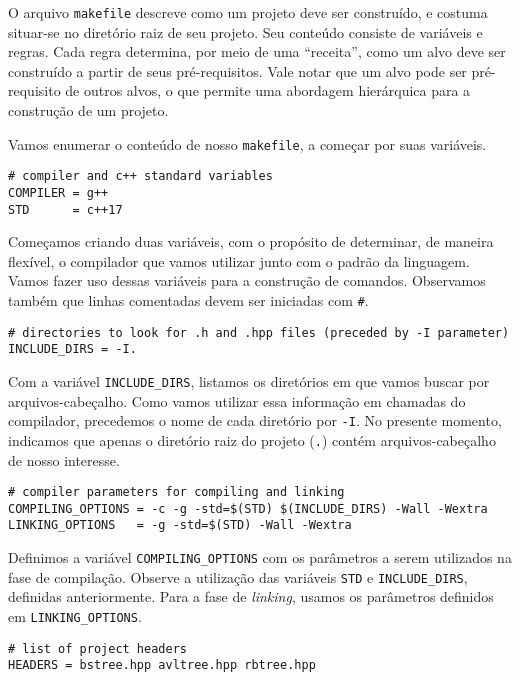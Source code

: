\documentclass[11pt]{article}
\begin{document}
O arquivo \texttt{makefile} descreve como um projeto deve ser
construído, e costuma situar-se no diretório raiz de seu projeto.
Seu conteúdo consiste de variáveis e regras.  Cada regra determina,
por meio de uma ``receita'', como um alvo deve ser construído a
partir de seus pré-requisitos.  Vale notar que um alvo pode ser
pré-requisito de outros alvos, o que permite uma abordagem
hierárquica para a construção de um projeto.

Vamos enumerar o conteúdo de nosso \texttt{makefile}, a começar por
suas variáveis.

\begin{verbatim}
# compiler and c++ standard variables
COMPILER = g++
STD      = c++17
\end{verbatim}

Começamos criando duas variáveis, com o propósito de determinar, de
maneira flexível, o compilador que vamos utilizar junto com o
padrão da linguagem.  Vamos fazer uso dessas variáveis para a
construção de comandos.  Observamos também que linhas comentadas
devem ser iniciadas com \texttt{\#}.

\begin{verbatim}
# directories to look for .h and .hpp files (preceded by -I parameter)
INCLUDE_DIRS = -I.
\end{verbatim}

Com a variável \texttt{INCLUDE\_DIRS}, listamos os diretórios em
que vamos buscar por arquivos-cabeçalho.  Como vamos utilizar essa
informação em chamadas do compilador, precedemos o nome de cada
diretório por \texttt{-I}.  No presente momento, indicamos que
apenas o diretório raiz do projeto (\texttt{.}) contém
arquivos-cabeçalho de nosso interesse.

\begin{verbatim}
# compiler parameters for compiling and linking
COMPILING_OPTIONS = -c -g -std=$(STD) $(INCLUDE_DIRS) -Wall -Wextra
LINKING_OPTIONS   = -g -std=$(STD) -Wall -Wextra
\end{verbatim}

Definimos a variável \texttt{COMPILING\_OPTIONS} com os parâmetros
a serem utilizados na fase de compilação.  Observe a utilização das
variáveis \texttt{STD} e \texttt{INCLUDE\_DIRS}, definidas
anteriormente. Para a fase de \emph{linking}, usamos os parâmetros
definidos em \texttt{LINKING\_OPTIONS}.

\begin{verbatim}
# list of project headers
HEADERS = bstree.hpp avltree.hpp rbtree.hpp
\end{verbatim}
\end{document}
